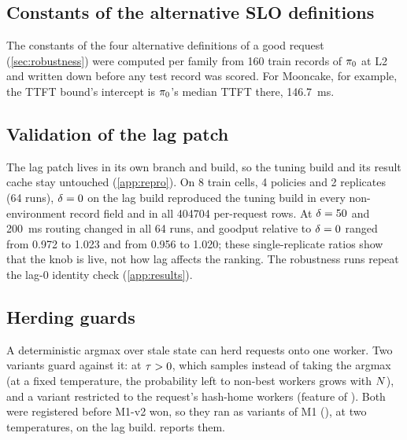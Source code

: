 \subsection{Constants of the alternative SLO definitions}

The constants of the four alternative definitions of a good request (\cref{sec:robustness}) were
computed per family from 160 train records of $\pi_{0}$ at L2 and written down before any test record
was scored. For Mooncake, for example, the TTFT bound's intercept is $\pi_{0}$'s median TTFT there,
\SI{146.7}{ms}.

\subsection{Validation of the lag patch}

The lag patch lives in its own branch and build, so the tuning build and its result cache stay
untouched (\cref{app:repro}). On 8 train cells, 4 policies and 2 replicates (64 runs), $\delta = 0$
on the lag build reproduced the tuning build in every non-environment record field and in all \num{404704} per-request rows. At
$\delta = 50$ and \SI{200}{ms} routing changed in all 64 runs, and goodput relative to $\delta = 0$
ranged from 0.972 to 1.023 and from 0.956 to 1.020; these single-replicate ratios show that the knob
is live, not how lag affects the ranking. The robustness runs repeat the lag-0 identity check
(\cref{app:results}).

\subsection{Herding guards}

A deterministic argmax over stale state can herd requests onto one worker. Two variants guard
against it: \lc{} at $\tau > 0$, which samples instead of taking the argmax (at a fixed
temperature, the probability left to non-best workers grows with $N$), and a variant restricted
to the request's hash-home workers (feature  of ). Both were registered
before M1-v2 won, so they ran as variants of M1 (), at two temperatures, on the lag build.
 reports them.

